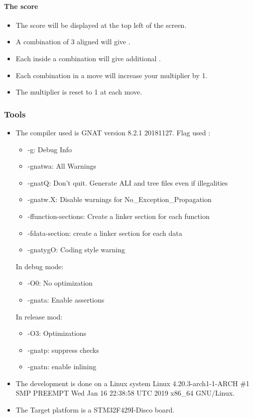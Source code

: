 \paragraph{The score}

\begin{itemize}
\item The score will be displayed at the top left of the screen.
\item A combination of 3 aligned \sqs will give \threepts \pts.
\item Each \sq inside a combination will give \sqpts additional \pts.
\item Each combination in a move will increase your multiplier by 1.
\item The multiplier is reset to 1 at each move.
\end{itemize}

\subsubsection{Tools}

\begin{itemize}
    \item The compiler used is GNAT version 8.2.1 20181127. Flag used :
        \begin{itemize}
            \item -g: Debug Info
            \item -gnatwa: All Warnings
            \item -gnatQ: Don't quit. Generate ALI and tree files even if illegalities
            \item -gnatw.X: Disable warnings for No\_Exception\_Propagation
            \item -ffunction-sections: Create a linker section for each function
            \item -fdata-section: create a linker section for each data
            \item -gnatygO: Coding style warning
        \end{itemize}
        In debug mode:
        \begin{itemize}
            \item -O0: No optimization
            \item -gnata: Enable assertions
        \end{itemize}
        In release mod:
        \begin{itemize}
            \item -O3: Optimizations
            \item -gnatp: suppress checks
            \item -gnatn: enable inlining
        \end{itemize}
    \item The development is done on a Linux system Linux 4.20.3-arch1-1-ARCH \#1 SMP
PREEMPT Wed Jan 16 22:38:58 UTC 2019 x86\_64 GNU/Linux.
\item The Target platform is a STM32F429I-Disco board.
\end{itemize}

